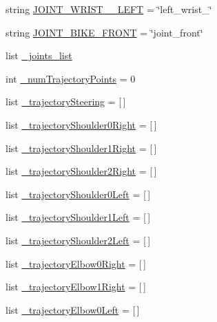 \begin{DoxyCompactItemize}
\item 
string \mbox{\hyperlink{namespacesteering__simulation_a0032de0d6332a1ae30dee3b30019d5f8}{J\+O\+I\+N\+T\+\_\+\+W\+R\+I\+S\+T\+\_\+\_\+\+L\+E\+FT}} = \char`\"{}left\+\_\+wrist\+\_\char`\"{}
\item 
string \mbox{\hyperlink{namespacesteering__simulation_a745b702c18a3c9c7ec661d2255a662c6}{J\+O\+I\+N\+T\+\_\+\+B\+I\+K\+E\+\_\+\+F\+R\+O\+NT}} = \char`\"{}joint\+\_\+front\char`\"{}
\item 
list \mbox{\hyperlink{namespacesteering__simulation_a76a7d611ad7418a972e460503b3f6ad5}{\+\_\+joints\+\_\+list}}
\item 
int \mbox{\hyperlink{namespacesteering__simulation_ab2b60690901db0cb00dcb7a84a575208}{\+\_\+num\+Trajectory\+Points}} = 0
\item 
list \mbox{\hyperlink{namespacesteering__simulation_ad897df89602b12dca6cf1d693cd90948}{\+\_\+trajectory\+Steering}} = \mbox{[}$\,$\mbox{]}
\item 
list \mbox{\hyperlink{namespacesteering__simulation_a8d39f809cc1766c3ac57a804f35d15fb}{\+\_\+trajectory\+Shoulder0\+Right}} = \mbox{[}$\,$\mbox{]}
\item 
list \mbox{\hyperlink{namespacesteering__simulation_a15d8c8b72dff883083c7e5993efd61b3}{\+\_\+trajectory\+Shoulder1\+Right}} = \mbox{[}$\,$\mbox{]}
\item 
list \mbox{\hyperlink{namespacesteering__simulation_a287bcf5cdb0db4a5423e7a275a85d2bb}{\+\_\+trajectory\+Shoulder2\+Right}} = \mbox{[}$\,$\mbox{]}
\item 
list \mbox{\hyperlink{namespacesteering__simulation_a679488f2cc2cdc4fd40d69ef424875a4}{\+\_\+trajectory\+Shoulder0\+Left}} = \mbox{[}$\,$\mbox{]}
\item 
list \mbox{\hyperlink{namespacesteering__simulation_a30de866115acae4df94758efa870918e}{\+\_\+trajectory\+Shoulder1\+Left}} = \mbox{[}$\,$\mbox{]}
\item 
list \mbox{\hyperlink{namespacesteering__simulation_a6e022b068f1ffb14c82a9a6433914fc3}{\+\_\+trajectory\+Shoulder2\+Left}} = \mbox{[}$\,$\mbox{]}
\item 
list \mbox{\hyperlink{namespacesteering__simulation_a34fabb2baf450d02baa482645b1900a9}{\+\_\+trajectory\+Elbow0\+Right}} = \mbox{[}$\,$\mbox{]}
\item 
list \mbox{\hyperlink{namespacesteering__simulation_aa3297ef058f1ff384a123c5fbcc47b9e}{\+\_\+trajectory\+Elbow1\+Right}} = \mbox{[}$\,$\mbox{]}
\item 
list \mbox{\hyperlink{namespacesteering__simulation_a7ac46e89903b8b00bfcea25d5a0a8514}{\+\_\+trajectory\+Elbow0\+Left}} = \mbox{[}$\,$\mbox{]}

\end{DoxyCompactItemize}
